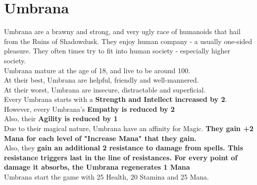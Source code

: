 \section{Umbrana}\label{race:umbrana}
Umbrana are a brawny and strong, and very ugly race of humanoids that hail from the Ruins of Shadowdusk.
They enjoy human company - a usually one-sided pleasure.
They often times try to fit into human society - especially higher society.\\
Umbrana mature at the age of 18, and live to be around 100.\\
At their best, Umbrana are helpful, friendly and well-mannered.\\
At their worst, Umbrana are insecure, distractable and superficial.\\
Every Umbrana starts with a \textbf{Strength and Intellect increased by 2}.\\
However, every Umbrana's \textbf{Empathy is reduced by 2}\\
Also, their \textbf{Agility is reduced by 1}\\
Due to their magical nature, Umbrana have an affinity for Magic. \textbf{They gain +2 Mana for each level of "Increase Mana" that they gain.}\\
Also, they \textbf{gain an additional 2 resistance to damage from spells. This resistance triggers last in the line of resistances. For every point of damage it absorbs, the Umbrana regenerates 1 Mana}\\
Umbrana start the game with 25 Health, 20 Stamina and 25 Mana.